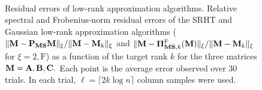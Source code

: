 \begin{figure}[htp]
 \\%
 \caption[Residual errors of low-rank approximation algorithms]{
 {\sc Residual errors of low-rank approximation algorithms.} Relative 
 spectral and Frobenius-norm residual errors of the SRHT and Gaussian low-rank approximation 
 algorithms ($\mbox{}\|\mathbf{M} - \mathbf{P}_{\mathbf{M}\mathbf{S}} \mathbf{M}\|_{\xi}/\mbox{}\|\mathbf{M} - \mathbf{M}_k\|_{\xi}$ 
 and $\mbox{}\|\mathbf{M} - \boldsymbol{\Pi}_{\mathbf{M}\mathbf{S}, k}^{\mathrm{F}}(\mathbf{M})\|_{\xi}/\mbox{}\|\mathbf{M} - \mathbf{M}_k\|_{\xi}$ 
 for $\xi = 2, \mathrm{F}$)
 as a function of the target rank $k$ for the three matrices $\mathbf{M} = \mathbf{A}, \mathbf{B}, \mathbf{C}.$ 
 Each point is the average error observed over 30 trials. 
 In each trial, $\ell = \lceil 2 k \log n \rceil$ column samples were used.}
 \label{ch3:fig:residualerrors}
\end{figure}
